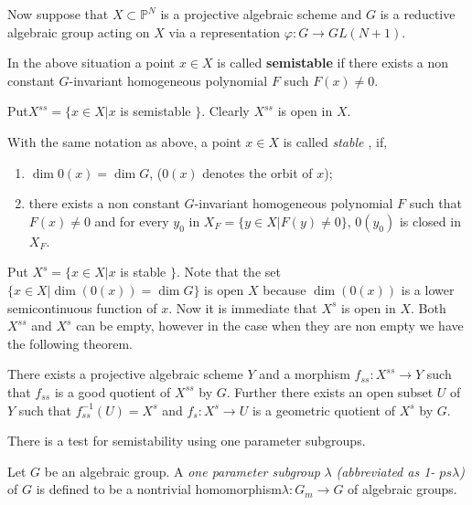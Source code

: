 {\begin{subexample}
Now suppose that $X \subset \mathbb{P}^N$ is a projective algebraic
scheme and $G$ is a reductive algebraic group acting on $X$ via a
representation $\varphi : G \rightarrow GL(N+1)$. 
\end{subexample}

\setcounter{subdefin}{2}
\begin{subdefin}\label{chap0:subdef0.0.3}%
In the above situation a point $x \in X$ is called
{\bf semi\-stable} if there exists a non constant $G$-invariant
homogeneous polynomial $F$ such $F(x) \neq 0$. 

Put\pageoriginale $X^{ss} = \{x \in X | x$ is semistable
$\}$. Clearly $X^{ss}$   is open in $X$.  
\end{subdefin}

\begin{subdefin}\label{chap0:subdef0.0.4}%
With the same notation as above, a point $x \in X$ is called
{\em{ stable }}, if, 
\begin{enumerate}[{\rm i)}]
\item $\dim 0(x) = \dim G$, ($0(x)$ denotes the orbit of $x$); 

\item there exists a non constant $G$-invariant homogeneous polynomial
  $F$ such that $F(x) \neq 0$ and for every $y_0$ in $X_F = \{y
  \in X | F(y) \neq 0 \}$, $0(y_0)$ is closed in $X_F$. 
\end{enumerate}

Put $X^s = \{x \in X|x$  is stable $\}$. Note that the set
$\{x \in X | \dim (0(x)) = \dim G\}$ is open $X$ because
$\dim(0(x))$ is a lower semicontinuous function of $x$. Now it is
immediate that $X^s$ is open in $X$. Both $X^{ss}$ and $X^s$ can be
empty, however in the case when they are non empty we have the
following theorem. 
\end{subdefin}

\setcounter{subtheorem}{4}
\begin{subtheorem}\label{chap0:subthm0.0.5}%
There exists a projective algebraic scheme $Y$ and a morphism $f_{ss}
: X^{ss} \rightarrow Y$ such that $f_{ss}$ is a good quotient of
$X^{ss}$ by $G$. Further there exists an open subset $U$ of $Y$ such
that $f^{-1}_{ss}(U) = X^s$ and $f_s : X^s \rightarrow U$ is a
geometric quotient of $X^s$ by $G$. 

There is a test for semistability using one parameter subgroups.
\end{subtheorem}

\setcounter{subdefin}{5}
\begin{subdefin}\label{chap0:subdef0.0.6}%
Let $G$ be an algebraic group. A {\em one parameter subgroup} $\lambda
$ {\em{(abbreviated as 1- $ps\lambda$)}} of $G$ is defined to be a
nontrivial homomorphism\pageoriginale $\lambda : G_m \rightarrow G$ of
algebraic groups.  


\end{subdefin}}

